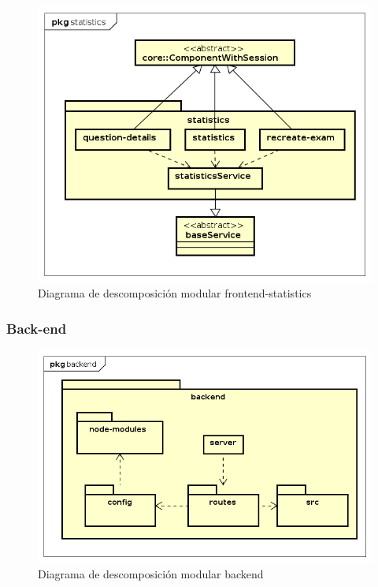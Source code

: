 \documentclass[openright,twoside,10pt]{book}
\begin{document}
    \begin{figure}[H]
        \begin{center}
            \includegraphics[width=\textwidth]{img/astah/disenio/descomposicion/front/statistics.png}
        \end{center}
        \caption{Diagrama de descomposición modular frontend-statistics}
    \end{figure}
    
    \vspace*{\fill} \newpage
    
    \subsubsection{Back-end}\label{back-end}
    
    \vspace*{\fill}
    
    \begin{figure}[H]
        \begin{center}
            \includegraphics[width=\textwidth]{img/astah/disenio/descomposicion/back/back.png}
        \end{center}
        \caption{Diagrama de descomposición modular backend}
    \end{figure}
    
\end{document}
